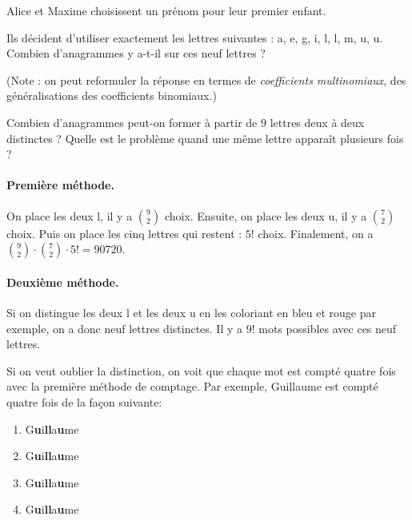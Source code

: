 \begin{exo}[Anagrammes]
Alice et Maxime choisissent un prénom pour leur premier enfant.

Ils décident d'utiliser exactement les lettres  suivantes : a, e, g, i, l, l, m, u, u.  Combien d'anagrammes y a-t-il sur ces neuf lettres ?

(Note : on peut reformuler la réponse en termes de \emph{coefficients multinomiaux}, des généralisations des coefficients binomiaux.)

\begin{hint} %
Combien d'anagrammes peut-on former à partir de $9$ lettres deux à deux distinctes ? Quelle est le problème quand une même lettre apparaît plusieurs fois ? 
\end{hint}

\begin{sol} %

\paragraph{Première méthode.} 
On place les deux \og{}l\fg{}, il y a $\binom{9}{2}$ choix. Ensuite, on place les deux \og{}u\fg{}, il y a $\binom{7}{2}$ choix. Puis on place les cinq lettres qui restent : $5!$ choix. Finalement, on a $\binom{9}{2}\cdot\binom{7}{2}\cdot 5!=90720$.


\paragraph{Deuxième méthode.} 
Si on distingue les deux \og{}l\fg{} et les deux \og{}u\fg{} en les coloriant en bleu et rouge par exemple, on a donc neuf lettres distinctes. Il y a $9!$ mots possibles avec ces neuf lettres.

Si on veut oublier la distinction, on voit que chaque mot est compté quatre fois avec la première méthode de comptage. Par exemple, \og Guillaume\fg{} est compté quatre fois de la façon suivante:
\begin{enumerate}
\item G{\bf\color{red}u}i{\bf\color{red}l}{\bf\color{blue}l}a{\bf\color{blue}u}me
\item G{\bf\color{blue}u}i{\bf\color{red}l}{\bf\color{blue}l}a{\bf\color{red}u}me
\item G{\bf\color{red}u}i{\bf\color{blue}l}{\bf\color{red}l}a{\bf\color{blue}u}me
\item G{\bf\color{blue}u}i{\bf\color{blue}l}{\bf\color{red}l}a{\bf\color{red}u}me
\end{enumerate}


\end{sol}
\end{exo}
